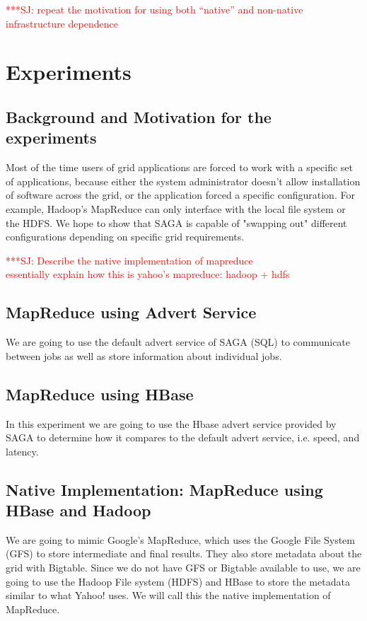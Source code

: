 \documentclass[conference,final]{IEEEtran}
\newcommand{\jhanote}[1]{ {\textcolor{red} { ***SJ: #1 }}}
\newcommand{\jhanote}[1]{}
\begin{document}

\jhanote{repeat the motivation for using both ``native'' and
  non-native infrastructure dependence}

\section{Experiments}

\subsection*{Background and Motivation for the experiments}

Most of the time users of grid applications are forced to work with a
specific set of applications, because either the system administrator
doesn't allow installation of software across the grid, or the
application forced a specific configuration.  For example, Hadoop's
MapReduce can only interface with the local file system or the HDFS.
We hope to show that SAGA is capable of "swapping out" different
configurations depending on specific grid requirements.

\jhanote{Describe the native implementation of mapreduce\\
  essentially explain how this is yahoo's mapreduce: hadoop + hdfs}


\subsection*{MapReduce using Advert Service}
We are going to use the default advert service of SAGA (SQL) to 
communicate between jobs as well as store information about 
individual jobs.

\subsection*{MapReduce using HBase}
In this experiment we are going to use the Hbase advert service 
provided by SAGA to determine how it compares to the default advert 
service, i.e. speed, and latency.

\subsection*{Native Implementation: MapReduce using HBase and Hadoop}
We are going to mimic Google's MapReduce, which uses the Google File
System (GFS) to store intermediate and final results.  They also store
metadata about the grid with Bigtable.  Since we do not have GFS or
Bigtable available to use, we are going to use the Hadoop File system
(HDFS) and HBase to store the metadata similar to what Yahoo! uses.
We will call this the native implementation of MapReduce.
\end{document}

